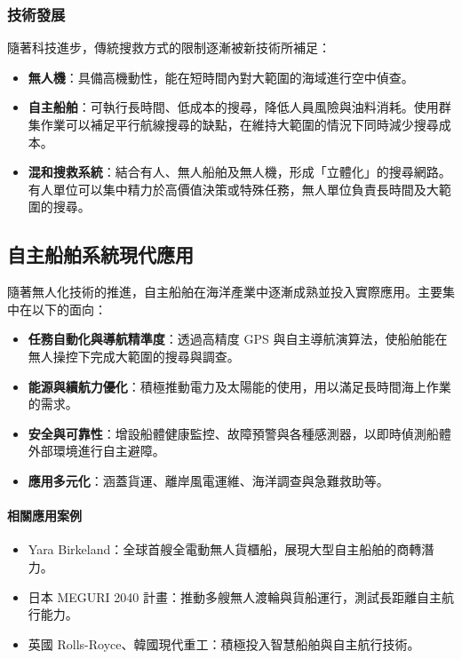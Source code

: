 \documentclass[12pt,a4paper]{article}
\begin{document}
\subsubsection{技術發展}
隨著科技進步，傳統搜救方式的限制逐漸被新技術所補足\cite{Ennong}：
\begin{itemize}
  \item \textbf{無人機}：具備高機動性，能在短時間內對大範圍的海域進行空中偵查。
  \item \textbf{自主船舶}：可執行長時間、低成本的搜尋，降低人員風險與油料消耗。使用群集作業可以補足平行航線搜尋的缺點，在維持大範圍的情況下同時減少搜尋成本。
  \item \textbf{混和搜救系統}：結合有人、無人船舶及無人機，形成「立體化」的搜尋網路。有人單位可以集中精力於高價值決策或特殊任務，無人單位負責長時間及大範圍的搜尋\cite{Survey}。
\end{itemize}

\subsection{自主船舶系統現代應用}
隨著無人化技術的推進，自主船舶在海洋產業中逐漸成熟並投入實際應用。主要集中在以下的面向\cite{autoboat}：
\begin{itemize}
  \item \textbf{任務自動化與導航精準度}：透過高精度 GPS 與自主導航演算法，使船舶能在無人操控下完成大範圍的搜尋與調查。
  \item \textbf{能源與續航力優化}：積極推動電力及太陽能的使用，用以滿足長時間海上作業的需求。
  \item \textbf{安全與可靠性}：增設船體健康監控、故障預警與各種感測器，以即時偵測船體外部環境進行自主避障。
  \item \textbf{應用多元化}：涵蓋貨運、離岸風電運維、海洋調查與急難救助等。
\end{itemize}

\paragraph{相關應用案例}
\begin{itemize}
  \item Yara Birkeland：全球首艘全電動無人貨櫃船，展現大型自主船舶的商轉潛力\cite{Yara}。
  \item 日本 MEGURI 2040 計畫：推動多艘無人渡輪與貨船運行，測試長距離自主航行能力\cite{Meguri}。
  \item 英國 Rolls-Royce、韓國現代重工：積極投入智慧船舶與自主航行技術\cite{Rolls}\cite{Hyundai}。
\end{itemize}
\end{document}
